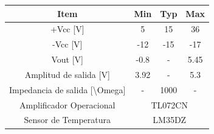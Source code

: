  \begin{table}[]
    \begin{tabular}{c|ccc}
    \textbf{Item}                                    & \textbf{Min} & \textbf{Typ} & \textbf{Max} \\ \hline
    +Vcc {[}V{]}                                     & 5            & 15           & 36           \\
    -Vcc {[}V{]}                                     & -12          & -15          & -17          \\
    Vout {[}V{]}                                     & -0.8         & -            & 5.45         \\
    Amplitud de salida {[}V{]}                       & 3.92         & -            & 5.3          \\
    Impedancia de salida {[}\textbackslash{}Omega{]} & -            & 1000         & -            \\
    Amplificador Operacional                         & \multicolumn{3}{c|}{TL072CN}               \\
    Sensor de Temperatura                            & \multicolumn{3}{c|}{LM35DZ}               
    \end{tabular}
    \label{"Datasheet de la implementaci\'on"}
    \end{table}